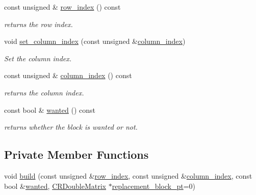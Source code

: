 \begin{DoxyCompactItemize}
const unsigned \& \hyperlink{classoomph_1_1BlockSelector_abc7c527ed8c1080d98bddf2a1f3c1801}{row\+\_\+index} () const
\begin{DoxyCompactList}\small\item\em returns the row index. \end{DoxyCompactList}\item 
void \hyperlink{classoomph_1_1BlockSelector_acb7166a82872ba91c5da1574a4dd8b62}{set\+\_\+column\+\_\+index} (const unsigned \&\hyperlink{classoomph_1_1BlockSelector_a2b18303d1dfdfe5aeee43fc9a5452f5c}{column\+\_\+index})
\begin{DoxyCompactList}\small\item\em Set the column index. \end{DoxyCompactList}\item 
const unsigned \& \hyperlink{classoomph_1_1BlockSelector_a2b18303d1dfdfe5aeee43fc9a5452f5c}{column\+\_\+index} () const
\begin{DoxyCompactList}\small\item\em returns the column index. \end{DoxyCompactList}\item 
const bool \& \hyperlink{classoomph_1_1BlockSelector_aceece28b03cdc41a43205603380126b9}{wanted} () const
\begin{DoxyCompactList}\small\item\em returns whether the block is wanted or not. \end{DoxyCompactList}\end{DoxyCompactItemize}
\subsection*{Private Member Functions}
\begin{DoxyCompactItemize}
\item 
void \hyperlink{classoomph_1_1BlockSelector_a5ed23c2fc70d78b46ddad425a9a91dfe}{build} (const unsigned \&\hyperlink{classoomph_1_1BlockSelector_abc7c527ed8c1080d98bddf2a1f3c1801}{row\+\_\+index}, const unsigned \&\hyperlink{classoomph_1_1BlockSelector_a2b18303d1dfdfe5aeee43fc9a5452f5c}{column\+\_\+index}, const bool \&\hyperlink{classoomph_1_1BlockSelector_aceece28b03cdc41a43205603380126b9}{wanted}, \hyperlink{classoomph_1_1CRDoubleMatrix}{C\+R\+Double\+Matrix} $\ast$\hyperlink{classoomph_1_1BlockSelector_ad40b427ae3228721a702f5bf82b2b829}{replacement\+\_\+block\+\_\+pt}=0)
\end{DoxyCompactItemize}
